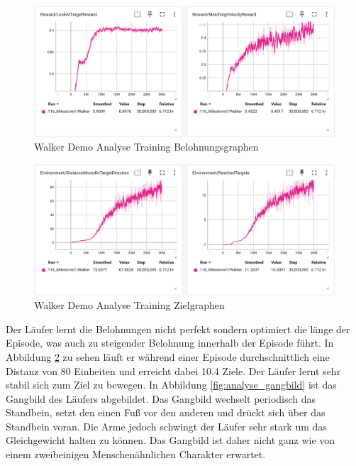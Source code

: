 \begin{figure}[H]
  \centering  
  \includegraphics[scale=0.5]{img/analyse_training_belohnung.png}
  \caption{Walker Demo Analyse Training Belohnungsgraphen}
  \label{fig:analyse_training_belohnung}
\end{figure}

\begin{figure}[H]
  \centering  
  \includegraphics[scale=0.5]{img/analyse_training2.png}
  \caption{Walker Demo Analyse Training Zielgraphen}
  \label{fig:analyse_training_2}
\end{figure}

Der Läufer lernt die Belohnungen nicht perfekt sondern optimiert die länge der Episode, was auch zu steigender Belohnung innerhalb der Episode führt. In Abbildung \ref{fig:analyse_training_2} zu sehen läuft er während einer Episode durchschnittlich eine Distanz von 80 Einheiten und erreicht dabei 10.4 Ziele. Der Läufer lernt sehr stabil sich zum Ziel zu bewegen. In Abbildung \ref{fig:analyse_gangbild} ist das Gangbild des Läufers abgebildet. Das Gangbild wechselt periodisch das Standbein, setzt den einen Fuß vor den anderen und drückt sich über das Standbein voran. Die Arme jedoch schwingt der Läufer sehr stark um das Gleichgewicht halten zu können. Das Gangbild ist daher nicht ganz wie von einem zweibeinigen Menschenähnlichen Charakter erwartet.

